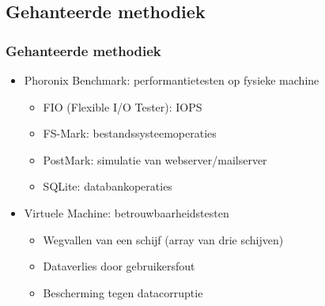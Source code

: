 \documentclass{beamer}
\begin{document}

\subsection{Gehanteerde methodiek}


\begin{frame}
\frametitle{Gehanteerde methodiek}
  \begin{itemize}
    \item Phoronix Benchmark: performantietesten op fysieke machine
    \begin{itemize}
      \item FIO (Flexible I/O Tester): IOPS
      \item FS-Mark: bestandssysteemoperaties
      \item PostMark: simulatie van webserver/mailserver
      \item SQLite: databankoperaties
    \end{itemize}
    \item Virtuele Machine: betrouwbaarheidstesten
    \begin{itemize}
      \item Wegvallen van een schijf (array van drie schijven)
      \item Dataverlies door gebruikersfout
      \item Bescherming tegen datacorruptie
    \end{itemize}
  \end{itemize}
\end{frame}
\end{document}
